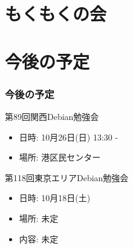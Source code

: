 \documentclass[cjk,dvipdfmx,10pt,compress,%
hyperref={bookmarks=true,bookmarksnumbered=true,bookmarksopen=false,%
colorlinks=false,%
pdftitle={第 88 回 関西 Debian 勉強会},%
pdfauthor={倉敷・のがた・佐々木・かわだ・八津尾},%
pdfsubject={資料},%
}]{beamer}
\begin{document}



\section{もくもくの会}


\section{今後の予定}
\begin{frame}[fragile]
\frametitle{今後の予定}

\begin{block}{第89回関西Debian勉強会}
  \begin{itemize}
  \item 日時: 10月26日(日) 13:30 -
  \item 場所: 港区民センター
  \end{itemize}
\end{block}

\begin{block}{第118回東京エリアDebian勉強会}
  \begin{itemize}
  \item 日時: 10月18日(土)
  \item 場所: 未定
  \item 内容: 未定
  \end{itemize}
\end{block}

\end{frame}

\takahashi[50]{  }
\end{document}
